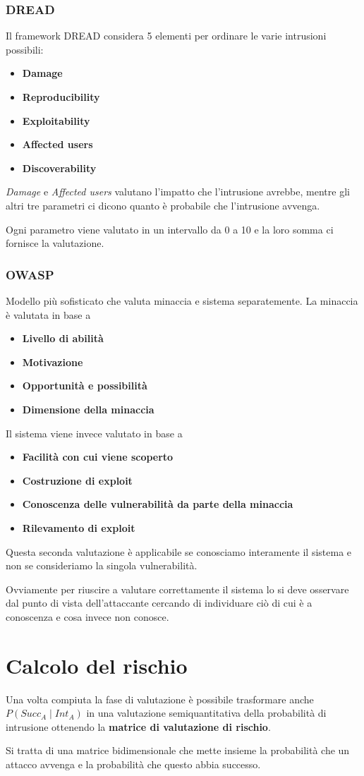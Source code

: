 \subsubsection{DREAD}
Il framework DREAD considera 5 elementi per ordinare le varie intrusioni possibili:
\begin{itemize}
	\item \textbf{Damage}
	\item \textbf{Reproducibility}
	\item \textbf{Exploitability}
	\item \textbf{Affected users}
	\item \textbf{Discoverability}
\end{itemize}
\emph{Damage} e \emph{Affected users} valutano l'impatto che l'intrusione avrebbe, mentre gli altri tre parametri ci
dicono quanto è probabile che l'intrusione avvenga.

Ogni parametro viene valutato in un intervallo da 0 a 10 e la loro somma ci fornisce la valutazione.

\subsubsection{OWASP}
Modello più sofisticato che valuta minaccia e sistema separatemente. La minaccia è valutata in base a
\begin{itemize}
	\item \textbf{Livello di abilità}
	\item \textbf{Motivazione}
	\item \textbf{Opportunità e possibilità}
	\item \textbf{Dimensione della minaccia}
\end{itemize}
Il sistema viene invece valutato in base a
\begin{itemize}
	\item \textbf{Facilità con cui viene scoperto}
	\item \textbf{Costruzione di exploit}
	\item \textbf{Conoscenza delle vulnerabilità da parte della minaccia}
	\item \textbf{Rilevamento di exploit}
\end{itemize}
Questa seconda valutazione è applicabile se conosciamo interamente il sistema e non se consideriamo la singola
vulnerabilità.

Ovviamente per riuscire a valutare correttamente il sistema lo si deve osservare dal punto di vista dell'attaccante
cercando di individuare ciò di cui è a conoscenza e cosa invece non conosce.

\section{Calcolo del rischio}
Una volta compiuta la fase di valutazione è possibile trasformare anche $P(Succ_A \mid Int_A)$ in una valutazione
semiquantitativa della probabilità di intrusione ottenendo la \textbf{matrice di valutazione di rischio}.

Si tratta di una matrice bidimensionale che mette insieme la probabilità che un attacco avvenga e la probabilità che
questo abbia successo.